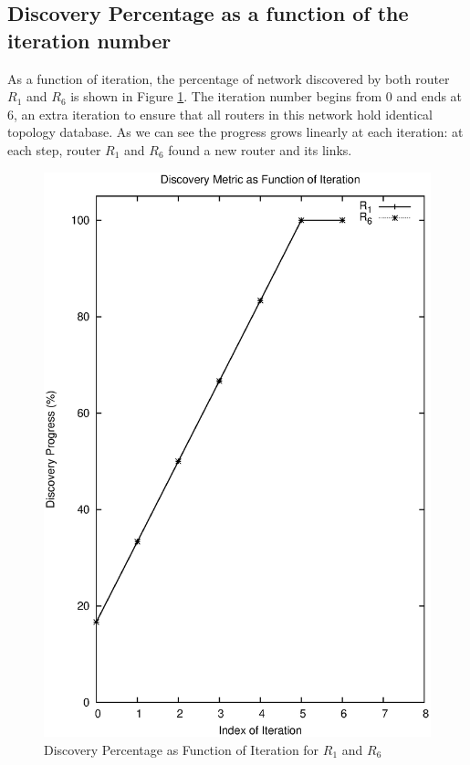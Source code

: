 \documentclass[12pt]{article}  %
\theoremstyle{definition}
\theoremstyle{remark}
\begin{document}
\subsection{Discovery Percentage as a function of the iteration number}
As a function of iteration, the percentage of network discovered by both router $R_1$ and $R_6$ is shown in Figure \ref{fig:progress}.
The iteration number begins from 0 and ends at 6, an extra iteration to ensure that all routers in this network hold identical topology database.
As we can see the progress grows linearly at each iteration: at each step, router $R_1$ and $R_6$ found a new router and its links.

\begin{figure}[h]
\centering
        \includegraphics[scale=0.6]{progress.ps}
\caption{Discovery Percentage as Function of Iteration for $R_1$ and $R_6$}
\label{fig:progress}
\end{figure}
\end{document}
